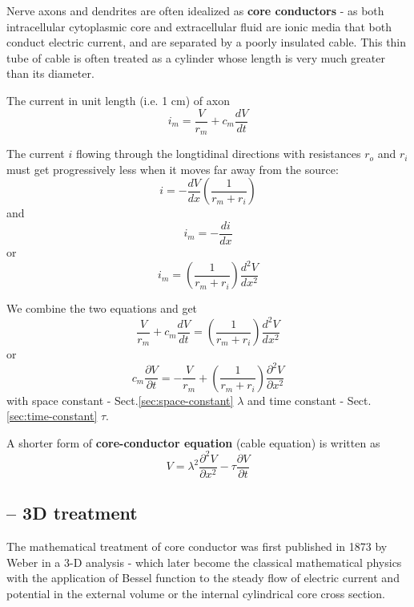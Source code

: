 Nerve axons and dendrites are often idealized as {\bf core conductors} - as both
intracellular cytoplasmic core and extracellular fluid are ionic media that both
conduct electric current, and are separated by a poorly insulated cable.
This thin tube of cable is often treated as a cylinder whose length is very much
greater than its diameter.

The current in unit length (i.e. 1 cm) of axon
\begin{equation}
i_m = \frac{V}{r_m} + c_m \frac{dV}{dt}
\end{equation}

The current $i$ flowing through the longtidinal directions with resistances
$r_o$ and $r_i$ must get progressively less when it moves far away from the
source:
\begin{equation}
i = - \frac{dV}{dx}\left(\frac{1}{r_m + r_i} \right)
\end{equation}
and
\begin{equation}
i_m = - \frac{di}{dx}
\end{equation}
or
\begin{equation}
i_m = \left(\frac{1}{r_m + r_i} \right) \frac{d^2V}{dx^2}
\end{equation}

We combine the two equations and get
\begin{equation}
\frac{V}{r_m} + c_m \frac{dV}{dt} = \left(\frac{1}{r_m + r_i} \right)
\frac{d^2V}{dx^2}
\end{equation}
or
\begin{equation}
c_m \frac{\partial V}{\partial t} = - \frac{V}{r_m} + \left(\frac{1}{r_m + r_i}
\right) \frac{\partial^2V}{\partial x^2}
\end{equation}
with space constant - Sect.\ref{sec:space-constant} $\lambda$ and time constant
- Sect.\ref{sec:time-constant} $\tau$.

A shorter form of {\bf core-conductor equation} (cable equation) is written as
\begin{equation}
V = \lambda^2 \frac{\partial^2V}{\partial x^2} - \tau \frac{\partial
V}{\partial t}
\end{equation}

\subsection{-- 3D treatment}

The mathematical treatment of core conductor was first published in 1873 by
Weber in a 3-D analysis - which later become the classical mathematical physics
with the application of Bessel function to the steady flow of electric current
and potential in the external volume or the internal cylindrical core cross
section.

